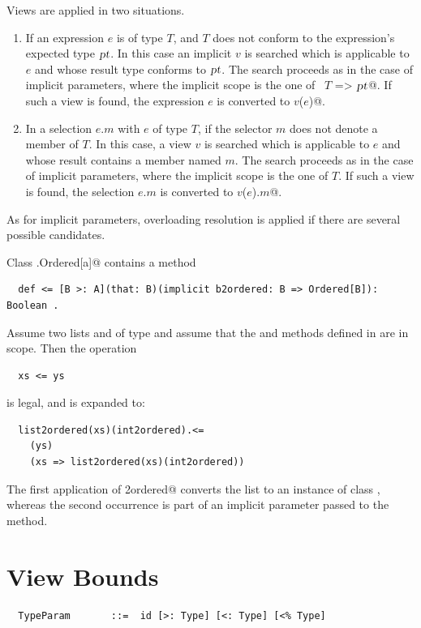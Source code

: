 Views are applied in two situations.
\begin{enumerate}
\item
If an expression $e$ is of type $T$, and $T$ does not conform to the
expression's expected type $\mbox{\sl pt}$. In this case an implicit $v$ is
searched which is applicable to $e$ and whose result type conforms to
$\mbox{\sl pt}$.  The search proceeds as in the case of implicit parameters,
where the implicit scope is the one of ~\lstinline@$T$ => $\mbox{\sl pt}$@. If
such a view is found, the expression $e$ is converted to
\lstinline@$v$($e$)@.
\item
In a selection $e.m$ with $e$ of type $T$, if the selector $m$ does
not denote a member of $T$.  In this case, a view $v$ is searched
which is applicable to $e$ and whose result contains a member named
$m$.  The search proceeds as in the case of implicit parameters, where
the implicit scope is the one of $T$.  If such a view is found, the
selection $e.m$ is converted to \lstinline@$v$($e$).$m$@.
\end{enumerate}
As for implicit parameters, overloading resolution is applied
if there are several possible candidates.

\example\label{ex:impl-ordered} Class \lstinline@scala.Ordered[a]@ contains a method
\begin{lstlisting}
  def <= [B >: A](that: B)(implicit b2ordered: B => Ordered[B]): Boolean .
\end{lstlisting}
Assume two lists  and  of type 
and assume that the  and 
methods defined in  are in scope.
Then the operation
\begin{lstlisting}
  xs <= ys
\end{lstlisting}
is legal, and is expanded to:
\begin{lstlisting}
  list2ordered(xs)(int2ordered).<=
    (ys)
    (xs => list2ordered(xs)(int2ordered))
\end{lstlisting}
The first application of \lstinline@list2ordered@ converts the list
 to an instance of class , whereas the second 
occurrence is part of an implicit parameter passed to the \code{<=} method.

\section{View Bounds}\label{sec:view-bounds}

\syntax\begin{lstlisting}
  TypeParam       ::=  id [>: Type] [<: Type] [<% Type]
\end{lstlisting}

